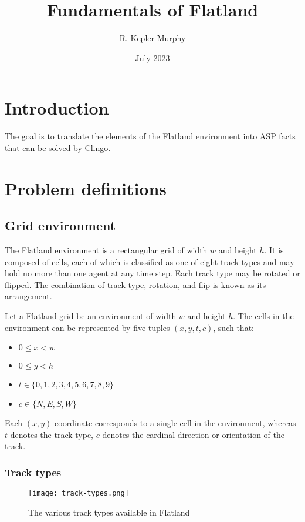 \documentclass{article}
\title{Fundamentals of Flatland}
\author{R. Kepler Murphy}
\date{July 2023}
\begin{document}
\maketitle

\section{Introduction}
The goal is to translate the elements of the Flatland environment into ASP facts that can be solved by Clingo.

\section{Problem definitions}
\subsection{Grid environment}
The Flatland environment is a rectangular grid of width $w$ and height $h$.  It is composed of cells, each of which is classified as one of eight track types and may hold no more than one agent at any time step. Each track type may be rotated or flipped. The combination of track type, rotation, and flip is known as its arrangement. 

 Let a Flatland grid be an environment of width $w$ and height $h$.  The cells in the environment can be represented by five-tuples $(x,y,t,c)$, such that:
\begin{itemize}
\itemsep0em 
    \item $0 \leq x < w$
    \item $0 \leq y < h$
    \item $t \in \{0,1,2,3,4,5,6,7,8,9\}$
    \item $c \in \{N,E,S,W\}$
\end{itemize} \medskip

 Each $(x,y)$ coordinate corresponds to a single cell in the environment, whereas $t$ denotes the track type, $c$ denotes the cardinal direction or orientation of the track.

\subsubsection*{Track types}

\begin{figure}[h]
    \caption{The various track types available in Flatland}
    \centering
    \texttt{[image: track-types.png]}
    \label{fig:track-types}
\end{figure}
\end{document}
